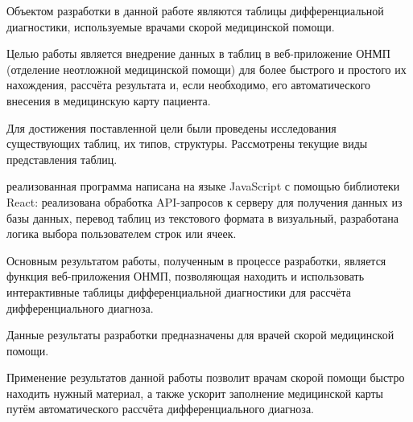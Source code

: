 \abstract %


Объектом разработки в данной работе являются таблицы дифференциальной диагностики, используемые врачами скорой медицинской помощи. 

Целью работы является внедрение данных в таблиц в веб-приложение ОНМП (отделение неотложной медицинской помощи) для более быстрого и простого их нахождения, рассчёта результата и, если необходимо, его автоматического внесения в медицинскую карту пациента.

Для достижения поставленной цели были проведены исследования существующих таблиц, их типов, структуры. Рассмотрены текущие виды представления таблиц. 

реализованная программа написана на языке JavaScript с помощью библиотеки React: реализована обработка API-запросов к серверу для получения данных из базы данных, перевод таблиц из текстового формата в визуальный, разработана логика выбора пользователем строк или ячеек.

Основным результатом работы, полученным в процессе разработки, является функция веб-приложения ОНМП, позволяющая находить и использовать интерактивные таблицы дифференциальной диагностики для рассчёта дифференциального диагноза. 

Данные результаты разработки предназначены для врачей скорой медицинской помощи.

Применение результатов данной работы позволит врачам скорой помощи быстро находить нужный материал, а также ускорит заполнение медицинской карты путём автоматического рассчёта дифференциального диагноза.